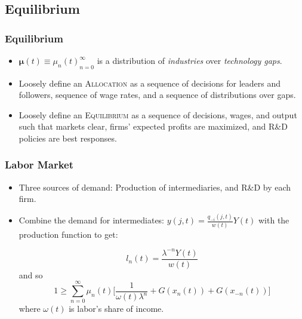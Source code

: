 \documentclass{beamer}
\begin{document}



\subsection{Equilibrium}
\label{sub:equilibrium}
\begin{frame}[t]\frametitle{Equilibrium} 
  \begin{itemize}

  \item<+-> $\bm{\mu}(t) \equiv {\mu_n(t)}_{n=0}^\infty$ is a distribution of \emph{industries} over \emph{technology gaps}.
  
  \item<+-> Loosely define an \textsc{Allocation} as a sequence of decisions for leaders and followers, sequence of wage rates, and a sequence of distributions over gaps.

  \item<+-> Loosely define an \textsc{Equilibrium} as a sequence of decisions, wages, and output such that markets clear, firms' expected profits are maximized, and R\&D policies are best responses. 

  \end{itemize}
\end{frame}


\begin{frame}[t]\frametitle{Labor Market} 
  \begin{itemize}
    \item<+-> Three sources of demand: Production of intermediaries, and R\&D by each firm.
    \item<+-> Combine the demand for intermediates: $y(j, t) = \frac{q_{-i}(j, t)}{w(t)}Y(t)$ with the production function to get:

      \begin{equation*}
        l_n(t) = \frac{\lambda^{-n}Y(t)}{w(t)}
      \end{equation*}
    and so
      \begin{equation*} \label{eq:labor_clearing}
        1 \geq \sum_{n=0}^{\infty} \mu_n(t) \Big[\frac{1}{\omega(t)\lambda^n} + G(x_n(t))    + G(x_{-n}(t))\Big]
      \end{equation*}
      where $\omega(t)$ is labor's share of income.

  \end{itemize}
\end{frame}
\end{document}
